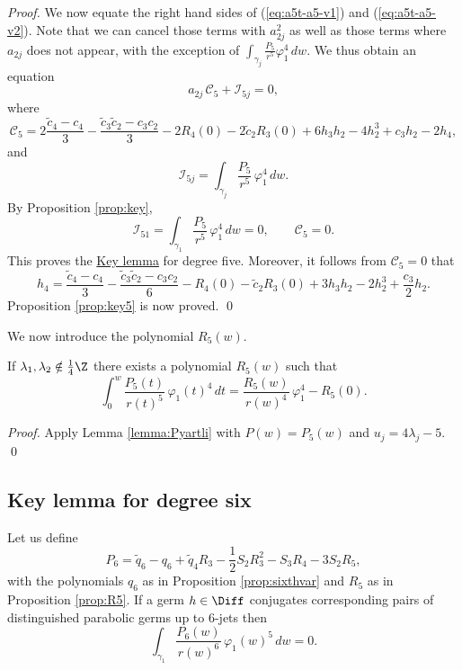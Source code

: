 \begin{proof}
We now equate the right hand sides of (\ref{eq:a5t-a5-v1}) and (\ref{eq:a5t-a5-v2}). Note that we can cancel those terms with $a_{2j}^2$ as well as those terms where $a_{2j}$ does not appear, with the exception of $\int_{\gamma_j}\frac{P_5}{r^5}\varphi_1^4\,dw$. We thus obtain an equation
\[ a_{2j}\,\mathcal{C}_5+\mathcal{I}_{5j}=0, \]
where 
\[ \mathcal{C}_5=2\frac{\tilde{c}_4-c_4}{3}-\frac{\tilde{c}_3\tilde{c}_2-c_3c_2}{3}-2R_4(0)-2\tilde{c}_2R_3(0)+6h_3h_2-4h_2^3+c_3h_2-2h_4, \]
and
\[ \mathcal{I}_{5j}=\int_{\gamma_j}\frac{P_5}{r^5}\,\varphi_1^{4}\,dw. \]
By Proposition \ref{prop:key},
\[ \mathcal{I}_{51}=\int_{\gamma_1}\frac{P_5}{r^5}\,\varphi_1^4\,dw=0, \qquad \mathcal{C}_5=0. \]
This proves the \hyperref[lemma:key]{Key lemma} for degree five. Moreover, it follows from $\mathcal{C}_5=0$ that
\[ h_4=\frac{\tilde{c}_4-c_4}{3}-\frac{\tilde{c}_3\tilde{c}_2-c_3c_2}{6}-R_4(0)-\tilde{c}_2R_3(0)+3h_3h_2-2h_2^3+\frac{c_3}{2}h_2. \]
Proposition \ref{prop:key5} is now proved.
\qed\end{proof}

We now introduce the polynomial $R_5(w)$.

\begin{proposition}\label{prop:R5} 
If $\lambda_1,\lambda_2\notin\frac{1}{4}\Z$ there exists a polynomial $R_5(w)$ such that
\[ \int_0^w\frac{P_5(t)}{r(t)^5}\,\varphi_1(t)^4\,dt=\frac{R_5(w)}{r(w)^4}\,\varphi_1^4-R_5(0). \]
\end{proposition}

\begin{proof}
Apply Lemma \ref{lemma:Pyartli} with $P(w)=P_5(w)$ and $u_j=4\lambda_j-5$. 
\qed\end{proof}





\subsection{Key lemma for degree six}


\begin{proposition}\label{prop:key6}
Let us define
\[ P_6=\tilde{q}_6-q_6+\tilde{q}_4R_3-\frac{1}{2}S_2R_3^2-S_3R_4-3S_2R_5, \]
with the polynomials $q_6$ as in Proposition \textnormal{\ref{prop:sixthvar}} and $R_5$ as in Proposition \textnormal{\ref{prop:R5}}. If a germ $h\in\Diff$ conjugates corresponding pairs of distinguished parabolic germs up to $6$-jets then
\[ \int_{\gamma_1}\frac{P_6(w)}{r(w)^6}\,\varphi_1(w)^5\,dw=0. \]
\end{proposition}

